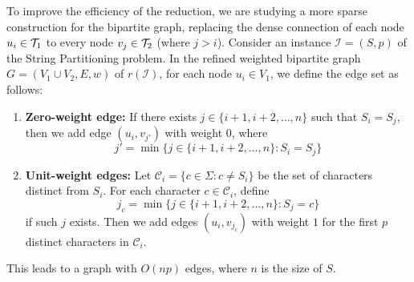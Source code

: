 To improve the efficiency of the reduction, we are studying a more sparse construction for the bipartite graph, replacing the dense connection of each node $u_i \in \mathcal{T}_{1}$ to every node $v_j \in \mathcal{T}_{2}$ (where $j>i$). Consider an instance $\mathcal{I}=(S,p)$ of the String Partitioning problem. In the refined weighted bipartite graph $G = (V_1 \cup V_2, E, w)$ of $r(\mathcal{I})$, for each node $u_i \in V_1$, we define the edge set as follows:
\begin{enumerate}
    \item \textbf{Zero-weight edge:} If there exists $j \in \{i+1, i+2, \ldots, n\}$ such that $S_i = S_j$, then we add edge $(u_i, v_{j'})$ with weight $0$, where
    $$j' = \min\{j \in \{i+1, i+2, \ldots, n\} : S_i = S_j\}$$
    
    \item \textbf{Unit-weight edges:} Let $\mathcal{C}_i = \{c \in \Sigma : c \neq S_i\}$ be the set of characters distinct from $S_i$. For each character $c \in \mathcal{C}_i$, define
    $$j_c = \min\{j \in \{i+1, i+2, \ldots, n\} : S_j = c\}$$
    if such $j$ exists. Then we add edges $(u_i, v_{j_c})$ with weight $1$ for the first $p$ distinct characters in $\mathcal{C}_i$.
\end{enumerate}
This leads to a graph with $O(np)$ edges, where $n$ is the size of $S$.

